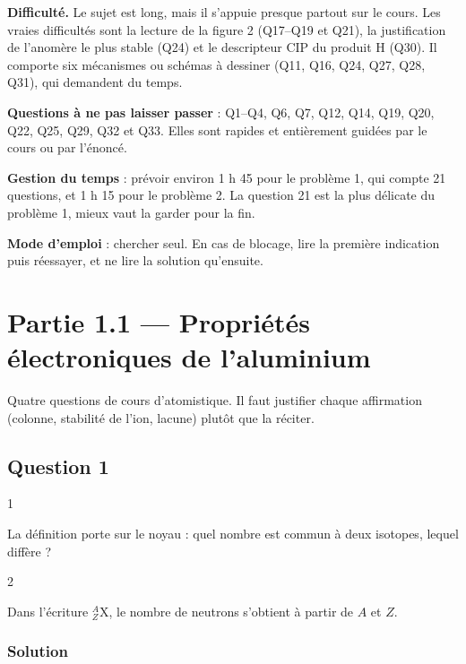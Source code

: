 \documentclass[11pt,a4paper]{article}
\begin{document}
\textbf{Difficulté.} Le sujet est long, mais il s'appuie presque partout sur le cours. Les vraies difficultés sont la lecture de la figure 2 (Q17--Q19 et Q21), la justification de l'anomère le plus stable (Q24) et le descripteur CIP du produit H (Q30). Il comporte six mécanismes ou schémas à dessiner (Q11, Q16, Q24, Q27, Q28, Q31), qui demandent du temps.

\textbf{Questions à ne pas laisser passer} : Q1--Q4, Q6, Q7, Q12, Q14, Q19, Q20, Q22, Q25, Q29, Q32 et Q33. Elles sont rapides et entièrement guidées par le cours ou par l'énoncé.

\textbf{Gestion du temps} : prévoir environ 1 h 45 pour le problème 1, qui compte 21 questions, et 1 h 15 pour le problème 2. La question 21 est la plus délicate du problème 1, mieux vaut la garder pour la fin.

\textbf{Mode d'emploi} : chercher seul. En cas de blocage, lire la première indication puis réessayer, et ne lire la solution qu'ensuite.

\hypertarget{partie-1.1-propriuxe9tuxe9s-uxe9lectroniques-de-laluminium}{%
\section{Partie 1.1 --- Propriétés électroniques de l'aluminium}\label{partie-1.1-propriuxe9tuxe9s-uxe9lectroniques-de-laluminium}}

Quatre questions de cours d'atomistique. Il faut justifier chaque affirmation (colonne, stabilité de l'ion, lacune) plutôt que la réciter.

\hypertarget{question-1}{%
\subsection{Question 1}\label{question-1}}

\begin{indication}{1}

La définition porte sur le noyau : quel nombre est commun à deux isotopes, lequel diffère ?

\end{indication}

\begin{indication}{2}

Dans l'écriture \(^{A}_{Z}\mathrm{X}\), le nombre de neutrons s'obtient à partir de \(A\) et \(Z\).

\end{indication}

\hypertarget{solution}{%
\subsubsection{Solution}\label{solution}}
\end{document}
